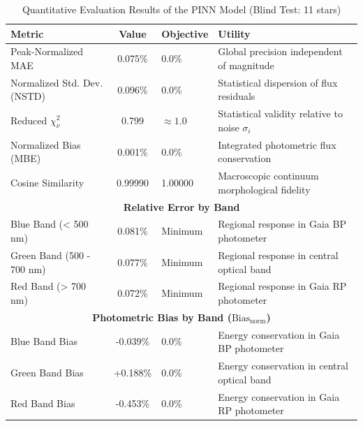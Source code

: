 
\begin{table}[htpb]
\centering
\caption{Quantitative Evaluation Results of the PINN Model (Blind Test: 11 stars)}
\label{tab:pinn_evaluation}
\begin{tabular}{lcll}
\hline
\textbf{Metric} & \textbf{Value} & \textbf{Objective} & \textbf{Utility} \\
\hline
Peak-Normalized MAE & 0.075\% & 0.0\% & Global precision independent of magnitude \\
Normalized Std. Dev. (NSTD) & 0.096\% & 0.0\% & Statistical dispersion of flux residuals \\
Reduced $\chi^2_\nu$ & 0.799 & $\approx 1.0$ & Statistical validity relative to noise $\sigma_i$ \\
Normalized Bias (MBE) & 0.001\% & 0.0\% & Integrated photometric flux conservation \\
Cosine Similarity & 0.99990 & 1.00000 & Macroscopic continuum morphological fidelity \\
\hline
\multicolumn{4}{c}{\textbf{Relative Error by Band}} \\
\hline
Blue Band (< 500 nm) & 0.081\% & Minimum & Regional response in Gaia BP photometer \\
Green Band (500 - 700 nm) & 0.077\% & Minimum & Regional response in central optical band \\
Red Band (> 700 nm) & 0.072\% & Minimum & Regional response in Gaia RP photometer \\
\hline
\multicolumn{4}{c}{\textbf{Photometric Bias by Band ($\text{Bias}_{\text{norm}}$)}} \\
\hline
Blue Band Bias & -0.039\% & 0.0\% & Energy conservation in Gaia BP photometer \\
Green Band Bias & +0.188\% & 0.0\% & Energy conservation in central optical band \\
Red Band Bias & -0.453\% & 0.0\% & Energy conservation in Gaia RP photometer \\
\hline
\end{tabular}
\end{table}

